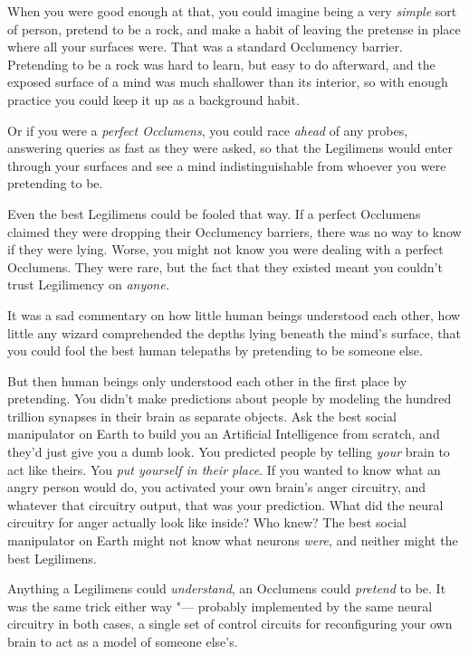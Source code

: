 When you were good enough at that, you could imagine being a very
\emph{simple} sort of person, pretend to be a rock, and make a habit of
leaving the pretense in place where all your surfaces were. That was a
standard Occlumency barrier. Pretending to be a rock was hard to learn,
but easy to do afterward, and the exposed surface of a mind was much
shallower than its interior, so with enough practice you could keep it
up as a background habit.

Or if you were a \emph{perfect Occlumens}, you could race \emph{ahead}
of any probes, answering queries as fast as they were asked, so that the
Legilimens would enter through your surfaces and see a mind
indistinguishable from whoever you were pretending to be.

Even the best Legilimens could be fooled that way. If a perfect
Occlumens claimed they were dropping their Occlumency barriers, there
was no way to know if they were lying. Worse, you might not know you
were dealing with a perfect Occlumens. They were rare, but the fact that
they existed meant you couldn't trust Legilimency on \emph{anyone.}

It was a sad commentary on how little human beings understood each
other, how little any wizard comprehended the depths lying beneath the
mind's surface, that you could fool the best human telepaths by
pretending to be someone else.

But then human beings only understood each other in the first place by
pretending. You didn't make predictions about people by modeling the
hundred trillion synapses in their brain as separate objects. Ask the
best social manipulator on Earth to build you an Artificial Intelligence
from scratch, and they'd just give you a dumb look. You predicted people
by telling \emph{your} brain to act like theirs. You \emph{put yourself
in their place}. If you wanted to know what an angry person would do,
you activated your own brain's anger circuitry, and whatever that
circuitry output, that was your prediction. What did the neural
circuitry for anger actually look like inside? Who knew? The best social
manipulator on Earth might not know what neurons \emph{were}, and
neither might the best Legilimens.

Anything a Legilimens could \emph{understand}, an Occlumens could
\emph{pretend} to be. It was the same trick either way "--- probably
implemented by the same neural circuitry in both cases, a single set of
control circuits for reconfiguring your own brain to act as a model of
someone else's.

